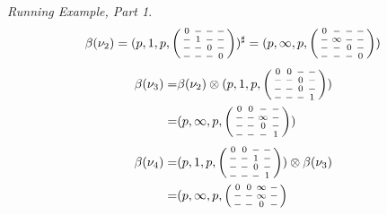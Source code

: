 \documentclass[10pt,a4paper]{amsart}
\theoremstyle{definition}
\numberwithin{equation}{section}
\theoremstyle{remark}
\newcommand{\nopath}{-}
\newenvironment{smallpmatrix}
  {\left(\begin{smallmatrix}}
  {\end{smallmatrix}\right)}
\theoremstyle{remark}
\newtheorem{runningexample/}{Running Example, Part}
\newenvironment{runningexample}
  {\renewcommand{\qedsymbol}{\color{darkgray}\ensuremath{\lrcorner}}%
   \pushQED{\qed}\begin{runningexample/}}
  {\popQED\end{runningexample/}}
\begin{document}
\begin{runningexample}
\[
\beta(\nu_2) =(p,1, p,  \begin{smallpmatrix}
  0 & \nopath & \nopath & \nopath\\
  \nopath & 1 & \nopath & \nopath\\
  \nopath & \nopath & 0 & \nopath\\
  \nopath & \nopath & \nopath & 0
  \end{smallpmatrix}  )^\sharp 
= (p,\infty, p, \begin{smallpmatrix}
  0 & \nopath & \nopath & \nopath\\
  \nopath & \infty & \nopath & \nopath\\
  \nopath & \nopath & 0 & \nopath\\
  \nopath & \nopath & \nopath & 0
  \end{smallpmatrix})
\]
\[
\begin{split} 
\beta(\nu_3) = & \beta(\nu_2) \otimes (p,1, p, \begin{smallpmatrix}
  0 & 0 & \nopath & \nopath\\
  \nopath & \nopath & 0 & \nopath\\
  \nopath & \nopath & 0 & \nopath\\
  \nopath & \nopath & \nopath & 1
  \end{smallpmatrix}) \\
= & (p,\infty, p, \begin{smallpmatrix}
  0 & 0 & \nopath & \nopath\\
  \nopath  & \nopath & \infty & \nopath\\
  \nopath & \nopath & 0 & \nopath\\
  \nopath & \nopath & \nopath & 1
  \end{smallpmatrix})
\end{split}
\]
\[
\begin{split} 
\beta(\nu_4) = &
(p,1,p,\begin{smallpmatrix}
   0 & 0 & \nopath & \nopath\\
   \nopath  & \nopath & 1 & \nopath\\
   \nopath & \nopath & 0 & \nopath\\
   \nopath & \nopath & \nopath & 1
   \end{smallpmatrix} ) \otimes \beta(\nu_3) \\
= &
 (p,\infty, p, \begin{smallpmatrix}
0 & 0 & \infty & \nopath\\
  \nopath  & \nopath & \infty & \nopath\\
  \nopath & \nopath & 0 & \nopath\\

\end{smallpmatrix}
\end{split}\]
\end{runningexample}
\end{document}
